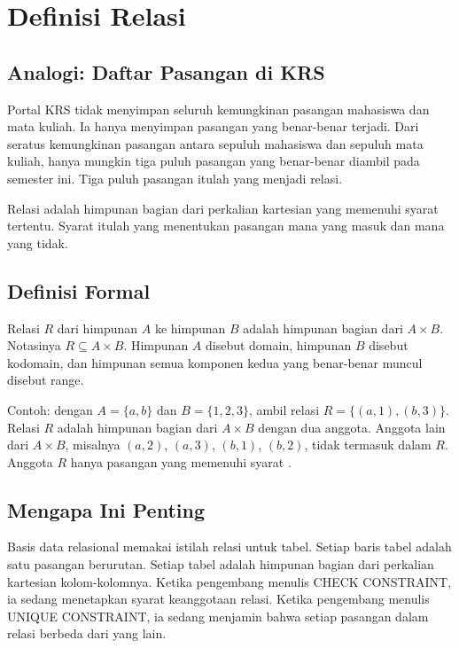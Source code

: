 \documentclass[11pt,a4paper]{article}
\begin{document}
\section{Definisi Relasi}

\subsection{Analogi: Daftar Pasangan di KRS}

Portal KRS tidak menyimpan seluruh kemungkinan pasangan mahasiswa dan mata kuliah. Ia hanya menyimpan pasangan yang benar-benar terjadi. Dari seratus kemungkinan pasangan antara sepuluh mahasiswa dan sepuluh mata kuliah, hanya mungkin tiga puluh pasangan yang benar-benar diambil pada semester ini. Tiga puluh pasangan itulah yang menjadi relasi.

Relasi adalah himpunan bagian dari perkalian kartesian yang memenuhi syarat tertentu. Syarat itulah yang menentukan pasangan mana yang masuk dan mana yang tidak.

\subsection{Definisi Formal}

Relasi $R$ dari himpunan $A$ ke himpunan $B$ adalah himpunan bagian dari $A \times B$. Notasinya $R \subseteq A \times B$. Himpunan $A$ disebut domain, himpunan $B$ disebut kodomain, dan himpunan semua komponen kedua yang benar-benar muncul disebut range.

Contoh: dengan $A=\{a,b\}$ dan $B=\{1,2,3\}$, ambil relasi $R=\{(a,1),(b,3)\}$. Relasi $R$ adalah himpunan bagian dari $A \times B$ dengan dua anggota. Anggota lain dari $A \times B$, misalnya $(a,2)$, $(a,3)$, $(b,1)$, $(b,2)$, tidak termasuk dalam $R$. Anggota $R$ hanya pasangan yang memenuhi syarat \cite{rosen}.

\subsection{Mengapa Ini Penting}

Basis data relasional memakai istilah relasi untuk tabel. Setiap baris tabel adalah satu pasangan berurutan. Setiap tabel adalah himpunan bagian dari perkalian kartesian kolom-kolomnya. Ketika pengembang menulis CHECK CONSTRAINT, ia sedang menetapkan syarat keanggotaan relasi. Ketika pengembang menulis UNIQUE CONSTRAINT, ia sedang menjamin bahwa setiap pasangan dalam relasi berbeda dari yang lain.
\end{document}
